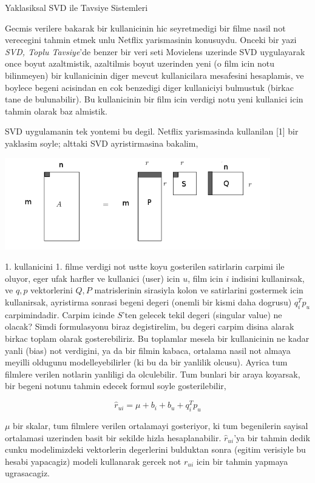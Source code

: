 \documentclass[12pt,fleqn]{article}\usepackage{../common}
\begin{document}
Yaklasiksal SVD ile Tavsiye Sistemleri

Gecmis verilere bakarak bir kullanicinin hic seyretmedigi bir filme nasil
not verecegini tahmin etmek unlu Netflix yarismasinin konusuydu. Onceki bir
yazi {\em SVD, Toplu Tavsiye}'de benzer bir veri seti Movielens uzerinde
SVD uygulayarak once boyut azaltmistik, azaltilmis boyut uzerinden yeni (o
film icin notu bilinmeyen) bir kullanicinin diger mevcut kullanicilara
mesafesini hesaplamis, ve boylece begeni acisindan en cok benzedigi diger
kullaniciyi bulmustuk (birkac tane de bulunabilir). Bu kullanicinin bir
film icin verdigi notu yeni kullanici icin tahmin olarak baz almistik.

SVD uygulamanin tek yontemi bu degil. Netflix yarismasinda kullanilan [1]
bir yaklasim soyle; alttaki SVD ayristirmasina bakalim,

\includegraphics[height=4cm]{svdapprox_1.png}

1. kullanicini 1. filme verdigi not ustte koyu gosterilen satirlarin
carpimi ile oluyor, eger ufak harfler ve kullanici (user) icin $u$, film
icin $i$ indisini kullanirsak, ve $q,p$ vektorlerini $Q,P$ matrislerinin
sirasiyla kolon ve satirlarini gostermek icin kullanirsak, ayristirma
sonrasi begeni degeri (onemli bir kismi daha dogrusu) $q_i^Tp_u$
carpimindadir. Carpim icinde $S$'ten gelecek tekil degeri (singular value)
ne olacak?  Simdi formulasyonu biraz degistirelim, bu degeri carpim disina
alarak birkac toplam olarak gosterebiliriz. Bu toplamlar mesela bir
kullanicinin ne kadar yanli (bias) not verdigini, ya da bir filmin kabaca,
ortalama nasil not almaya meyilli oldugunu modelleyebilirler (ki bu da bir
yanlilik olcusu). Ayrica tum filmlere verilen notlarin yanliligi da
olculebilir. Tum bunlari bir araya koyarsak, bir begeni notunu tahmin
edecek formul soyle gosterilebilir,

$$
\hat{r}_{ui} = \mu + b_i + b_u + q_i^Tp_u
$$

$\mu$ bir skalar, tum filmlere verilen ortalamayi gosteriyor, ki tum
begenilerin sayisal ortalamasi uzerinden basit bir sekilde hizla
hesaplanabilir. $\hat{r}_{ui}$'ya bir tahmin dedik cunku modelimizdeki
vektorlerin degerlerini bulduktan sonra (egitim verisiyle bu hesabi
yapacagiz) modeli kullanarak gercek not $r_{ui}$ icin bir
tahmin yapmaya ugrasacagiz.
\end{document}
